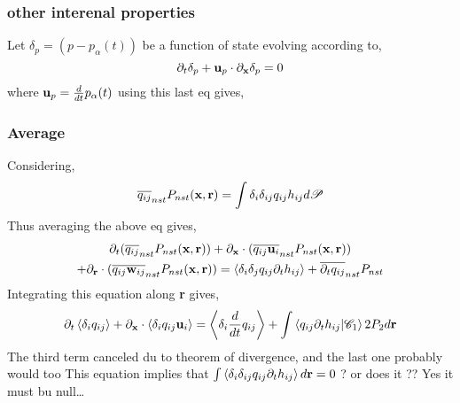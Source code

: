 \subsubsection*{other interenal properties}
Let $\delta_p = (p - p_\alpha(t))$ be a function of state evolving according to, 
\begin{equation*}
    \partial_t \delta_p
    + \textbf{u}_p \cdot \partial_{\textbf{x}}    \delta_p
    = 0 
\end{equation*}
where $\textbf{u}_p = \frac{d}{d t} p_\alpha(t)$ using this last eq gives, 
\subsubsection*{Average}
Considering,
\begin{equation*}
    \overline{q_{ij}}_{nst} P_{nst}(\textbf{x},\textbf{r})= \int\delta_i\delta_{ij} q_{ij} h_{ij} d\mathscr{P} 
\end{equation*}
Thus averaging the above eq gives, 
\begin{multline*}
    \partial_t (\overline{q_{ij}}_{nst} P_{nst}(\textbf{x},\textbf{r})) 
    + \partial_\textbf{x} \cdot ( \overline{q_{ij}\textbf{u}_i}_{nst} P_{nst}(\textbf{x},\textbf{r}))\\
    + \partial_\textbf{r} \cdot ( \overline{q_{ij}\textbf{w}_{ij}}_{nst} P_{nst}(\textbf{x},\textbf{r})) 
    = 
    \left<\delta_i\delta_{j}q_{ij}\partial_t h_{ij} \right>
    + \overline{\partial_t q_{ij}}_{nst}P_{nst}
\end{multline*}
Integrating this equation along \textbf{r} gives, 
\begin{equation}
    \partial_t \left<\delta_i q_{ij}\right> 
    + \partial_\textbf{x} \cdot  \left<\delta_i q_{ij}\textbf{u}_i\right>
    = 
    \left<\delta_i \frac{d}{d t} q_{ij}\right>
    + \int \left<q_{ij}\partial_t h_{ij} | \mathscr{C}_1\right>{2}P_2d\textbf{r}
\end{equation}
The third term canceled du to theorem of divergence, and the last one probably would too 
This equation implies that $ \int\left<\delta_i\delta_{ij}q_{ij}\partial_t h_{ij} \right>d\textbf{r} =0 $  ? or does it ??
Yes it must bu null\ldots



